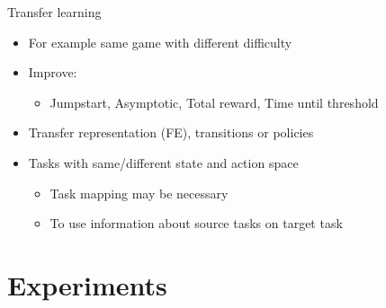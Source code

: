\begin{frame}[fragile]{Transfer learning}
{\begin{itemize}
        \item For example same game with different difficulty
        \item Improve:
        \begin{itemize}
            \item Jumpstart, Asymptotic, Total reward, Time until threshold
        \end{itemize}
        \item Transfer representation (FE), transitions or policies
        \item Tasks with same/different state and action space
        \begin{itemize}
            \item Task mapping may be necessary
            \item To use information about source tasks on target task
        \end{itemize}
    \end{itemize}
}
\end{frame}

\part{Experiments}
